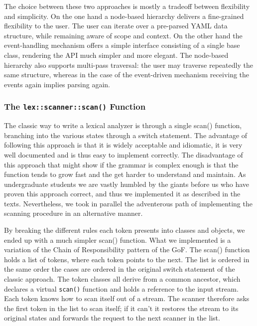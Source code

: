 \documentclass{article}
\begin{document}
The choice between these two approaches is mostly a tradeoff between 
flexibility and simplicity.  On the one hand a node-based hierarchy delivers a 
fine-grained flexibility to the user.  The user can iterate over a pre-parsed 
YAML data structure, while remaining aware of scope and context.  On the other 
hand the event-handling mechanism offers a simple interface consisting of a 
single base class, rendering the API much simpler and more elegant.  The 
node-based hierarchy also supports multi-pass traversal:  the user may traverse 
repeatedly the same structure, whereas in the case of the event-driven 
mechanism receiving the events again implies parsing again.

\subsubsection{The \texttt{lex::scanner::scan()} Function}
\label{scan_function}
The classic way to write a lexical analyzer is through a single scan() 
function, branching into the various states through a switch statement.  The 
advantage of following this approach is that it is widely acceptable and 
idiomatic, it is very well documented and is thus easy to implement correctly.  
The disadvantage of this approach that might show if the grammar is complex 
enough is that the function tends to grow fast and the get harder to understand 
and maintain.  As undergraduate students we are vastly humbled by the giants 
before us who have proven this approach correct, and thus we implemented it as 
described in the texts.  Nevertheless, we took in parallel the adventerous path 
of implementing the scanning procedure in an alternative manner.

By breaking the different rules each token presents into classes and objects, 
we ended up with a much simpler scan() function.  What we implemented is a 
variation of the Chain of Responsibility pattern of the GoF.  The scan() 
function holds a list of tokens, where each token points to the next.  The list 
is ordered in the same order the cases are ordered in the original switch 
statement of the classic approach.  The token classes all derive from a common 
ancestor, which declares a virtual \texttt{scan()} function and holds a reference to the 
input stream.  Each token knows how to scan itself out of a stream.  The 
scanner therefore asks the first token in the list to scan itself;  if it can't 
it restores the stream to its original states and forwards the request to the 
next scanner in the list.
\end{document}
